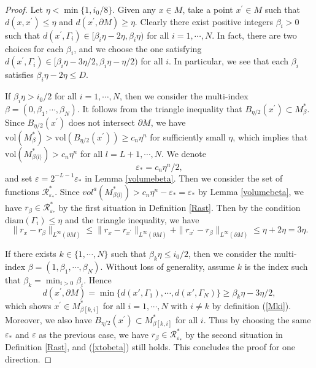 \documentclass[11pt,letterpaper]{amsart}
\numberwithin{equation}{section}
\theoremstyle{definition}
\theoremstyle{plain}
\theoremstyle{definition}
\theoremstyle{plain}
\theoremstyle{definition}
\theoremstyle{plain}
\newcommand{\vol}{\textrm{vol}}
\begin{document}
\begin{proof}
Let $\eta<\min\{1,i_0/8\}$. Given any $x\in M$, take a point $x^{\prime}\in M$ such that $d(x,x^{\prime})\leqslant\eta$ and $d(x^{\prime},\partial M)\geqslant \eta$. Clearly there exist positive integers $\beta_i>0$ such that $d(x^{\prime},\Gamma_i)\in [\beta_i\eta-2\eta,\beta_i\eta)$ for all $i=1,\cdots,N$. In fact, there are two choices for each $\beta_i$, and we choose the one satisfying $d(x^{\prime},\Gamma_i)\in [\beta_i\eta-3\eta/2,\beta_i\eta-\eta/2)$ for all $i$. In particular, we see that each $\beta_i$ satisfies $\beta_i\eta-2\eta\leqslant D$.

If $\beta_i\eta>i_0/2$ for all $i=1,\cdots,N$, then we consider the multi-index $\beta=(0,\beta_1,\cdots,\beta_N)$. It follows from the triangle inequality that $B_{\eta/2}(x^{\prime})\subset M_{\beta}^{\ast}$. Since $B_{\eta/2}(x^{\prime})$ does not intersect $\partial M$, we have $\vol(M_{\beta}^{\ast})> \vol(B_{\eta/2}(x^{\prime}))\geqslant c_n\eta^n$ for sufficiently small $\eta$, which implies that $\vol(M_{\beta\langle l\rangle}^{\ast})>c_n \eta^n$ for all $l=L+1,\cdots,N$. We denote 
\begin{equation}\label{epsilon-star}
\varepsilon_{\ast}=c_n\eta^n/2, 
\end{equation}
and set $\varepsilon=2^{-L-1}\varepsilon_{\ast}$ in Lemma \ref{volumebeta}. Then we consider the set of functions $\mathcal{R}^{\ast}_{\varepsilon_{\ast}}$. Since $vol^a(M_{\beta\langle l\rangle}^{\ast})>c_n\eta^n-\varepsilon_{\ast}=\varepsilon_{\ast}$ by Lemma \ref{volumebeta}, we have $r_{\beta}\in \mathcal{R}^{\ast}_{\varepsilon_{\ast}}$ by the first situation in Definition \ref{Rast}. Then by the condition $\textrm{diam}(\Gamma_i)\leqslant \eta$ and the triangle inequality, we have 
\begin{equation}\label{xtobeta}
\|r_x-r_{\beta}\|_{L^{\infty}(\partial M)}\leqslant \|r_x-r_{x^{\prime}}\|_{L^{\infty}(\partial M)}+\|r_{x^{\prime}}-r_{\beta}\|_{L^{\infty}(\partial M)}\leqslant\eta+2\eta=3\eta.
\end{equation}

If there exists $k\in \{1,\cdots,N\}$ such that $\beta_k\eta\leqslant i_0/2$, then we consider the multi-index $\beta=(1,\beta_1,\cdots,\beta_N)$. Without loss of generality, assume $k$ is the index such that $\beta_k=\min_{i> 0} \beta_i$.
Hence
$$d(x^{\prime},\partial M)= \min \big\{d(x',\Gamma_1),\cdots,d(x',\Gamma_N) \big\}\geqslant \beta_k\eta-3\eta/2,$$
which shows $x^{\prime}\in M_{\beta[k,i]}^{\ast}$ for all $i=1,\cdots,N$ with $i\neq k$ by definition (\ref{Mki}). Moreover, we also have $B_{\eta/2}(x^{\prime})\subset M_{\beta[k,i]}^{\ast}$ for all $i$. Thus by choosing the same $\varepsilon_{\ast}$ and $\varepsilon$ as the previous case, we have $r_{\beta}\in \mathcal{R}^{\ast}_{\varepsilon_{\ast}}$ by the second situation in Definition \ref{Rast}, and (\ref{xtobeta}) still holds. This concludes the proof for one direction.


\end{proof}
\end{document}

